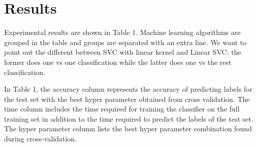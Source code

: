 \section{Results}

Experimental results are shown in Table 1. Machine
learning algorithms are grouped in the table and groups are separated
with an extra line. We want to point out the different between SVC
with linear kernel and Linear SVC: the former does one vs one
classification while the latter does one vs the rest classification. 

In Table 1, the accuracy column represents the accuracy of
predicting labels for the test set with the best hyper parameter
obtained from cross validation. The time column includes the time
required for training the classifier on the full training set in
addition to the time required to predict the labels of the test
set. The hyper parameter column lists the best hyper parameter
combination found during cross-validation. 

